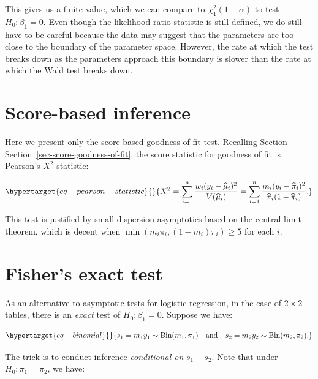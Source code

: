 \documentclass[
  11pt,
  letterpaper,
  oneside]{book}
\theoremstyle{definition}
\theoremstyle{plain}
\theoremstyle{plain}
\theoremstyle{plain}
\theoremstyle{remark}
\begin{document}
This gives us a finite value, which we can compare to
\(\chi^2_{1}(1-\alpha)\) to test \(H_0: \beta_1 = 0\). Even though the
likelihood ratio statistic is still defined, we do still have to be
careful because the data may suggest that the parameters are too close
to the boundary of the parameter space. However, the rate at which the
test breaks down as the parameters approach this boundary is slower than
the rate at which the Wald test breaks down.

\hypertarget{sec-score-based-inference}{%
\section{Score-based inference}\label{sec-score-based-inference}}

Here we present only the score-based goodness-of-fit test. Recalling
Section Section~\ref{sec-score-goodness-of-fit}, the score statistic for
goodness of fit is Pearson's \(X^2\) statistic:

\begin{equation}\protect\hypertarget{eq-pearson-statistic}{}{
X^2 = \sum_{i = 1}^n \frac{w_i (y_i - \widehat \mu_i)^2}{V(\widehat \mu_i)} = \sum_{i = 1}^n \frac{m_i(y_i - \widehat \pi_i)^2}{\widehat \pi_i(1-\widehat \pi_i)}.
}\label{eq-pearson-statistic}\end{equation}

This test is justified by small-dispersion asymptotics based on the
central limit theorem, which is decent when
\(\min(m_i \pi_i, (1-m_i)\pi_i) \geq 5\) for each \(i\).

\hypertarget{sec-fisher-exact-test}{%
\section{Fisher's exact test}\label{sec-fisher-exact-test}}

As an alternative to asymptotic tests for logistic regression, in the
case of \(2 \times 2\) tables, there is an \emph{exact} test of
\(H_0: \beta_1 = 0\). Suppose we have:

\begin{equation}\protect\hypertarget{eq-binomial}{}{
s_1 = m_1y_1 \sim \text{Bin}(m_1, \pi_1) \quad \text{and} \quad s_2 = m_2y_2 \sim \text{Bin}(m_2, \pi_2).
}\label{eq-binomial}\end{equation}

The trick is to conduct inference \emph{conditional on} \(s_1 + s_2\).
Note that under \(H_0: \pi_1 = \pi_2\), we have:
\end{document}
